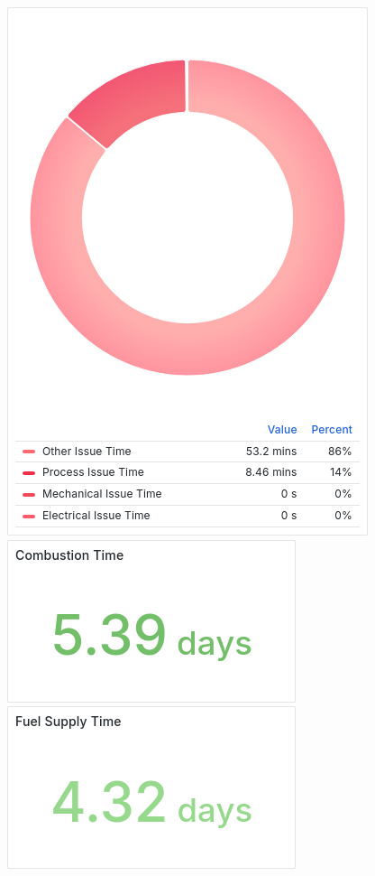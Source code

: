 \documentclass{article}
\begin{document}
\includegraphics[width=\textwidth]{panel_0019-0019.png}
\includegraphics[width=\textwidth]{panel_0020-0010.png}
\includegraphics[width=\textwidth]{panel_0024-0010.png}
\end{document}

